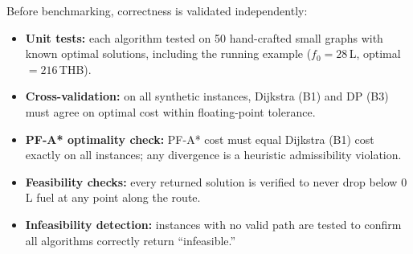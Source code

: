 Before benchmarking, correctness is validated independently:
\begin{itemize}
    \item \textbf{Unit tests:} each algorithm tested on 50 hand-crafted small graphs with
          known optimal solutions, including the running example
          ($f_0=28$\,L, optimal $=216$\,THB).
    \item \textbf{Cross-validation:} on all synthetic instances, Dijkstra (B1) and DP (B3)
          must agree on optimal cost within floating-point tolerance.
    \item \textbf{PF-A* optimality check:} PF-A* cost must equal Dijkstra (B1) cost exactly
          on all instances; any divergence is a heuristic admissibility violation.
    \item \textbf{Feasibility checks:} every returned solution is verified to never drop below
          0\,L fuel at any point along the route.
    \item \textbf{Infeasibility detection:} instances with no valid path are tested to confirm
          all algorithms correctly return ``infeasible.''
\end{itemize}
